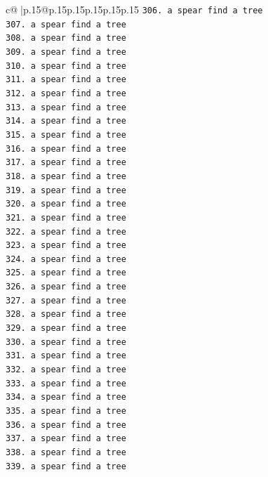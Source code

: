 \documentclass{article}
\begin{document}
{\begin{supertabular}{c@{$\;$}|p{.15\linewidth}@{}p{.15\linewidth}p{.15\linewidth}p{.15\linewidth}p{.15\linewidth}p{.15\linewidth}}
{{{\texttt{306. a spear find a tree} \\
\texttt{307. a spear find a tree} \\
\texttt{308. a spear find a tree} \\
\texttt{309. a spear find a tree} \\
\texttt{310. a spear find a tree} \\
\texttt{311. a spear find a tree} \\
\texttt{312. a spear find a tree} \\
\texttt{313. a spear find a tree} \\
\texttt{314. a spear find a tree} \\
\texttt{315. a spear find a tree} \\
\texttt{316. a spear find a tree} \\
\texttt{317. a spear find a tree} \\
\texttt{318. a spear find a tree} \\
\texttt{319. a spear find a tree} \\
\texttt{320. a spear find a tree} \\
\texttt{321. a spear find a tree} \\
\texttt{322. a spear find a tree} \\
\texttt{323. a spear find a tree} \\
\texttt{324. a spear find a tree} \\
\texttt{325. a spear find a tree} \\
\texttt{326. a spear find a tree} \\
\texttt{327. a spear find a tree} \\
\texttt{328. a spear find a tree} \\
\texttt{329. a spear find a tree} \\
\texttt{330. a spear find a tree} \\
\texttt{331. a spear find a tree} \\
\texttt{332. a spear find a tree} \\
\texttt{333. a spear find a tree} \\
\texttt{334. a spear find a tree} \\
\texttt{335. a spear find a tree} \\
\texttt{336. a spear find a tree} \\
\texttt{337. a spear find a tree} \\
\texttt{338. a spear find a tree} \\
\texttt{339. a spear find a tree} \\
}}}
\end{supertabular}}
\end{document}
